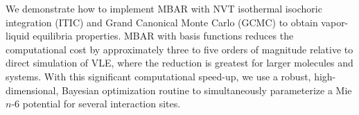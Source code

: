\documentclass[11pt,a4paper]{article}
\begin{document}
	We demonstrate how to implement MBAR with NVT isothermal isochoric integration (ITIC) and Grand Canonical Monte Carlo (GCMC) to obtain vapor-liquid equilibria properties. MBAR with basis functions reduces the computational cost by approximately three to five orders of magnitude relative to direct simulation of VLE, where the reduction is greatest for larger molecules and systems. With this significant computational speed-up, we use a robust, high-dimensional, Bayesian optimization routine to simultaneously parameterize a Mie $n$-6 potential for several interaction sites. 
	
\end{document}
